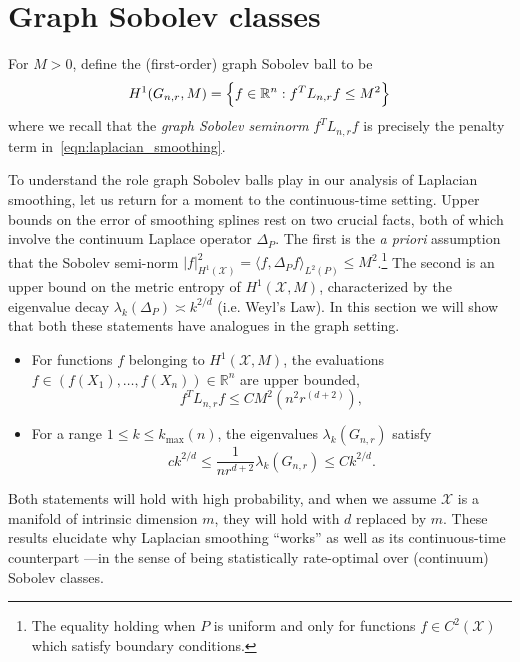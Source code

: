 \documentclass{article}
\newcommand{\Reals}{\mathbb{R}}
\newcommand{\1}{\mathbf{1}}
\newcommand{\Lap}{L}
\newcommand{\Xset}{\mathcal{X}}
\newcommand{\Leb}{L}
\theoremstyle{alden}
\theoremstyle{aldenthm}
\theoremstyle{definition}
\theoremstyle{remark}
\begin{document}
\section{Graph Sobolev classes}
\label{sec:graph_sobolev_classes}

For $M > 0$, define the (first-order) graph Sobolev ball to be
\begin{equation}
\label{eqn:graph_sobolev_ball}
H^1(G_{n,r},M) = \Bigl\{f \in \Reals^n: f^T \Lap_{n,r} f \leq M^2\Bigr\}
\end{equation}
where we recall that the \emph{graph Sobolev seminorm} $f^T \Lap_{{n,r}} f$ is precisely the penalty term in~\eqref{eqn:laplacian_smoothing}. 

To understand the role graph Sobolev balls play in our analysis of Laplacian smoothing, let us return for a moment to the continuous-time setting. Upper bounds on the error of smoothing splines rest on two crucial facts, both of which involve the continuum Laplace operator $\Delta_P$. The first is the \textit{a priori} assumption that the Sobolev semi-norm $|f|_{H^1(\Xset)}^2 = \langle f, \Delta_P f \rangle_{\Leb^2(P)} \leq M^2$.\footnote{The equality holding when $P$ is uniform and  only for functions $f \in C^2(\Xset)$ which satisfy boundary conditions.} The second is an upper bound on the metric entropy of $H^1(\Xset,M)$, characterized by the eigenvalue decay $\lambda_k(\Delta_P) \asymp k^{2/d}$ (i.e. Weyl's Law). In this section we will show that both these statements have analogues in the graph setting.
\begin{itemize}
	\item For functions $f$ belonging to $H^1(\Xset,M)$, the evaluations $f \in (f(X_1),\ldots,f(X_n)) \in \Reals^n$ are upper bounded,
	\begin{equation}
	\label{eqn:graph_sobolev_seminorm_vague}
	f^T \Lap_{n,r} f \leq C M^2(n^{2}r^{(d + 2)}),
	\end{equation}
	\item For a range $1 \leq k \leq k_{\max}(n)$, the eigenvalues $\lambda_k(G_{n,r})$ satisfy
	\begin{equation}
	\label{eqn:neighborhood_graph_eigenvalue_vague}
	ck^{2/d} \leq \frac{1}{nr^{d + 2}} \lambda_k(G_{n,r})  \leq Ck^{2/d}.
	\end{equation}
\end{itemize}
Both statements will hold with high probability, and when we assume $\Xset$ is a manifold of intrinsic dimension $m$, they will hold with $d$ replaced by $m$.  These results elucidate why Laplacian smoothing ``works'' as well as its continuous-time counterpart ---in the sense of being statistically rate-optimal over (continuum) Sobolev classes.
\end{document}
